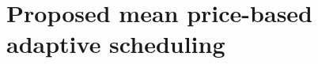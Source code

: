 \documentclass[journal]{IEEEtran}
\begin{document}
%	
\section{Proposed mean price-based adaptive scheduling}\label{proposed mean price-based}
\end{document}
